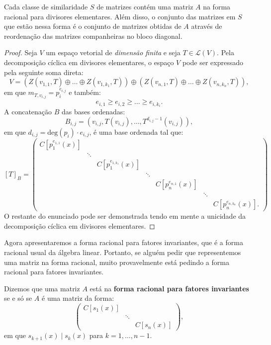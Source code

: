 \documentclass[11pt,twoside,a4paper]{book}
\begin{document}
\begin{teorema}
Cada classe de similaridade $S$ de matrizes contém uma matriz $A$ na forma racional para divisores elementares. Além disso, o conjunto das matrizes em $S$ que estão nessa forma
é o conjunto de matrizes obtidas de $A$ através de reordenação das matrizes companheiras no bloco diagonal.
\end{teorema}
\begin{proof}
Seja $V$ um espaço vetorial de \emph{dimensão finita} e seja $T\in\mathcal{L}(V)$. Pela decomposição cíclica em divisores elementares, o espaço $V$ pode ser expressado pela seguinte soma direta:
\[
V=\left(Z(v_{1,1},T)\oplus\dots\oplus Z(v_{1,k_1},T)\right)\oplus\left(Z(v_{n,1},T)\oplus\dots\oplus Z(v_{n,k_n},T)\right),
\]
em que $m_{T,v_{i,j}}=p_i^{e_{i,j}}$ e também:
\[
e_{i,1}\geq e_{i,2}\geq\dots\geq e_{i,k_i}.
\]
A concatenação $B$ das bases ordenadas:
\[
B_{i,j}=\left(v_{i,j},T(v_{i,j}),\dots,T^{d_{i,j}-1}(v_{i,j})\right),
\]
em que $d_{i,j}=\mathrm{deg}(p_i)\cdot e_{i,j}$, é uma base ordenada tal que:
\[
[T]_B=\begin{pmatrix}
C[p_1^{e_{1,1}}(x)]&&&&&&\\&\ddots&&&&&\\&&C[p_1^{e_{1,k_1}}(x)]&&&&\\&&&\ddots&&&\\&&&&C[p_n^{e_{n,1}}(x)]&&\\&&&&&\ddots&\\&&&&&&C[p_n^{e_{n,k_n}}(x)].
\end{pmatrix}
\]
O restante do enunciado pode ser demonstrada tendo em mente a unicidade da decomposição cíclica em divisores elementares.
\end{proof}

\noindent
Agora apresentaremos a forma racional para fatores invariantes, que é a forma racional usual da álgebra linear. Portanto, se alguém pedir que representemos uma matriz na forma racional, muito provavelmente está pedindo a forma racional para fatores invariantes.

\begin{definicao}
Dizemos que uma matriz $A$ está na \textbf{forma racional para fatores invariantes} se e só se $A$ é uma matriz da forma:
\[
\begin{pmatrix}
C[s_1(x)]&&\\&\ddots&\\&&C[s_n(x)]
\end{pmatrix},
\]
em que $s_{k+1}(x)\mid s_k(x)$ para $k=1,\dots,n-1$.
\end{definicao}
\end{document}
